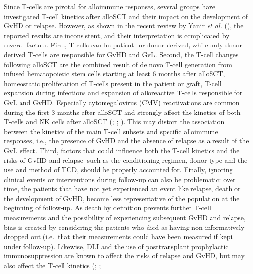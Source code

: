 \documentclass[
  letterpaper,
  DIV=11,
  numbers=noendperiod]{scrreprt}
\begin{document}
Since T-cells are pivotal for alloimmune responses, several groups have
investigated T-cell kinetics after alloSCT and their impact on the
development of GvHD or relapse. However, as shown in the recent review
by Yanir \emph{et al.}
(), the
reported results are inconsistent, and their interpretation is
complicated by several factors. First, T-cells can be patient- or
donor-derived, while only donor-derived T-cells are responsible for GvHD
and GvL. Second, the T-cell changes following alloSCT are the combined
result of de novo T-cell generation from infused hematopoietic stem
cells starting at least 6 months after alloSCT, homeostatic
proliferation of T-cells present in the patient or graft, T-cell
expansion during infections and expansion of alloreactive T-cells
responsible for GvL and GvHD. Especially cytomegalovirus (CMV)
reactivations are common during the first 3 months after alloSCT and
strongly affect the kinetics of both T-cells and NK cells after alloSCT
(;
; ). This may distort the association between the kinetics of
the main T-cell subsets and specific alloimmune responses, i.e., the
presence of GvHD and the absence of relapse as a result of the GvL
effect. Third, factors that could influence both the T-cell kinetics and
the risks of GvHD and relapse, such as the conditioning regimen, donor
type and the use and method of TCD, should be properly accounted for.
Finally, ignoring clinical events or interventions during follow-up can
also be problematic: over time, the patients that have not yet
experienced an event like relapse, death or the development of GvHD,
become less representative of the population at the beginning of
follow-up. As death by definition prevents further T-cell measurements
and the possibility of experiencing subsequent GvHD and relapse, bias is
created by considering the patients who died as having non-informatively
dropped out (i.e.~that their measurements could have been measured if
kept under follow-up). Likewise, DLI and the use of posttransplant
prophylactic immunosuppression are known to affect the risks of relapse
and GvHD, but may also affect the T-cell kinetics
(;
;
\end{document}
